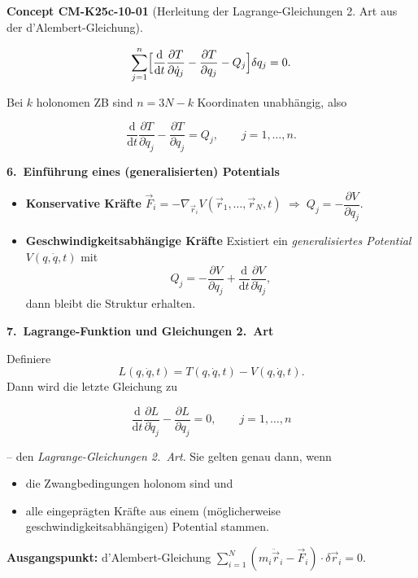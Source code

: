 \documentclass[10pt, letterpaper]{article}
\newcommand{\CustomHeading}[3]{%
  \par\medskip\noindent%
  \textbf{#1 #2} \textnormal{(#3)}.\enskip%
}
\newenvironment{CONC}[2]{\begin{unitbox}\CustomHeading{Concept}{#1}{#2}}{\end{unitbox}}
\begin{document}
\begin{CONC}{CM-K25c-10-01}{Herleitung der Lagrange-Gleichungen 2. Art aus der d’Alembert-Gleichung}
\[
  \sum_{j=1}^{n}
    \Bigl[
      \frac{\mathrm d}{\mathrm dt}\frac{\partial T}{\partial\dot q_j}
      -
      \frac{\partial T}{\partial q_j}
      -
      Q_j
    \Bigr]\delta q_j=0.
\]

Bei $k$ holonomen ZB sind $n=3N-k$ Koordinaten unabhängig, also

\[
  \boxed{\;
    \frac{\mathrm d}{\mathrm dt}\frac{\partial T}{\partial\dot q_j}
    -
    \frac{\partial T}{\partial q_j}
    =Q_j,
    \qquad j=1,\dots,n .\;}
\]

\textbf{6.\ Einführung eines (generalisierten) Potentials}

\begin{itemize}
\item \textbf{Konservative Kräfte}  
      $\vec F_i=-\nabla_{\vec r_i}V(\vec r_1,\dots,\vec r_N,t)$  
      $\Longrightarrow\;Q_j=-\dfrac{\partial V}{\partial q_j}$.
\item \textbf{Geschwindigkeitsabhängige Kräfte}  
      Existiert ein \emph{generalisiertes Potential}
      $V(q,\dot q,t)$ mit
      \[
        Q_j=-\frac{\partial V}{\partial q_j}
            +\frac{\mathrm d}{\mathrm dt}
             \frac{\partial V}{\partial\dot q_j},
      \]
      dann bleibt die Struktur erhalten.
\end{itemize}

\textbf{7.\ Lagrange-Funktion und Gleichungen 2.\ Art}

Definiere
\[
  L(q,\dot q,t)=T(q,\dot q,t)-V(q,\dot q,t).
\]
Dann wird die letzte Gleichung zu

\[
  \boxed{\;
    \frac{\mathrm d}{\mathrm dt}\frac{\partial L}{\partial\dot q_j}
    -
    \frac{\partial L}{\partial q_j}=0,
    \qquad j=1,\dots,n
  \;}
\]

– den \emph{Lagrange-Gleichungen 2.\ Art}.  
Sie gelten genau dann, wenn
\begin{itemize}
  \item die Zwangbedingungen holonom sind und
  \item alle eingeprägten Kräfte aus einem (möglicherweise
        geschwindigkeitsabhängigen) Potential stammen.
\end{itemize}
\end{CONC}





\textbf{Ausgangspunkt:} d'Alembert-Gleichung $\sum_{i=1}^N (m_i\ddot{\vec{r}}_i-\vec{F}_i)\cdot\delta\vec{r}_i = 0$.
\end{document}
